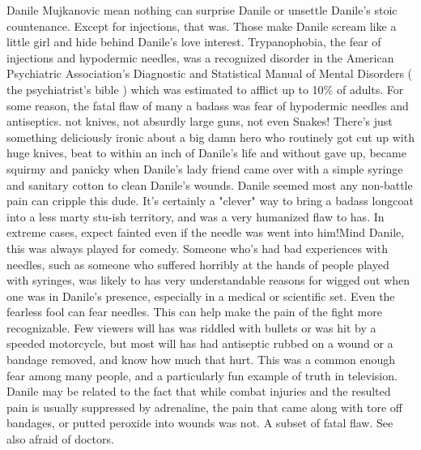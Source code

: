 \documentclass[12pt]{book}
\begin{document}
Danile Mujkanovic mean nothing can surprise Danile or unsettle Danile's stoic countenance. Except for injections, that was. Those make Danile scream like a little girl and hide behind Danile's love interest. Trypanophobia, the fear of injections and hypodermic needles, was a recognized disorder in the American Psychiatric Association's Diagnostic and Statistical Manual of Mental Disorders ( the psychiatrist's bible ) which was estimated to afflict up to 10\% of adults. For some reason, the fatal flaw of many a badass was fear of hypodermic needles and antiseptics. not knives, not absurdly large guns, not even Snakes! There's just something deliciously ironic about a big damn hero who routinely got cut up with huge knives, beat to within an inch of Danile's life and without gave up, became squirmy and panicky when Danile's lady friend came over with a simple syringe and sanitary cotton to clean Danile's wounds. Danile seemed most any non-battle pain can cripple this dude. It's certainly a "clever" way to bring a badass longcoat into a less marty stu-ish territory, and was a very humanized flaw to has. In extreme cases, expect fainted  even if the needle was went into him!Mind Danile, this was always played for comedy. Someone who's had bad experiences with needles, such as someone who suffered horribly at the hands of people played with syringes, was likely to has very understandable reasons for wigged out when one was in Danile's presence, especially in a medical or scientific set. Even the fearless fool can fear needles. This can help make the pain of the fight more recognizable. Few viewers will has was riddled with bullets or was hit by a speeded motorcycle, but most will has had antiseptic rubbed on a wound or a bandage removed, and know how much that hurt. This was a common enough fear among many people, and a particularly fun example of truth in television. Danile may be related to the fact that while combat injuries and the resulted pain is usually suppressed by adrenaline, the pain that came along with tore off bandages, or putted peroxide into wounds was not. A subset of fatal flaw. See also afraid of doctors.
\end{document}

